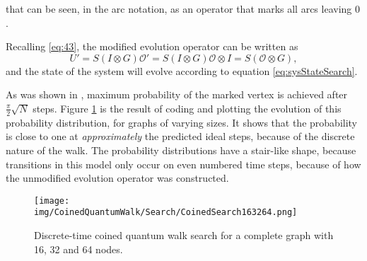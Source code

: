 \documentclass[../../dissertation.tex]{subfiles}
\begin{document}
that can be seen, in the arc notation, as an operator that marks all arcs leaving $0$.\par
Recalling \ref{eq:43}, the modified evolution operator can be written as
\begin{equation}
	U' = S(I \otimes G)\mathcal{O'} = S(I \otimes G)\mathcal{O} \otimes I = S (\mathcal{O} \otimes G),\label{eq:modifiedEvoCoined}
\end{equation}
and the state of the system will evolve according to equation \ref{eq:sysStateSearch}.\par
As was shown in \cite{REN1}, maximum probability of the marked vertex is achieved after $\frac{\pi}{2}\sqrt{N}$ steps. Figure \ref{fig:coinedSearch} is the result of coding and plotting the evolution of this probability distribution, for graphs of varying sizes. It shows that the probability is close to one at \textit{approximately} the predicted ideal steps, because of the discrete nature of the walk. The probability distributions have a stair-like shape, because transitions in this model only occur on even numbered time steps, because of how the unmodified evolution operator was constructed.

\begin{figure}[!h]
	\centering
	\texttt{[image: img/CoinedQuantumWalk/Search/CoinedSearch163264.png]}
	\caption{Discrete-time coined quantum walk search for a complete graph with 16, 32 and 64 nodes.}\label{fig:coinedSearch}
\end{figure}
\end{document}
